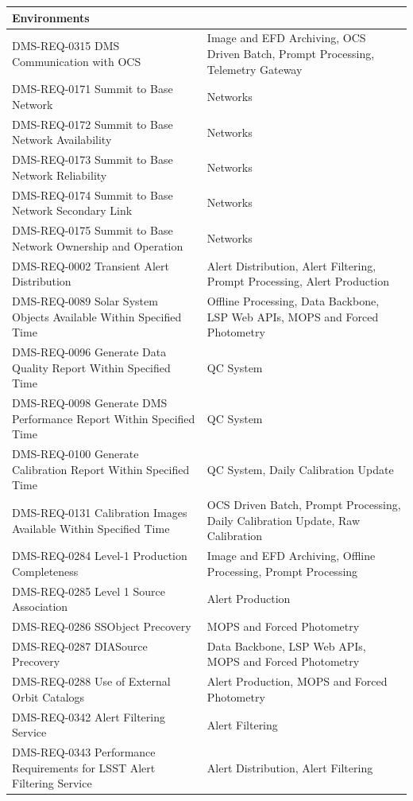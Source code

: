 \documentclass[DM,lsstdraft,toc]{lsstdoc}
\begin{document}
\begin{xtabular}{|p{0.4\textwidth}|p{0.55\textwidth}|}
Environments\\ \hline
DMS-REQ-0315 DMS Communication with OCS & Image and EFD Archiving, OCS
Driven Batch, Prompt Processing, Telemetry Gateway\\ \hline
DMS-REQ-0171 Summit to Base Network & Networks\\ \hline
DMS-REQ-0172 Summit to Base Network Availability &
Networks\\ \hline
DMS-REQ-0173 Summit to Base Network Reliability &
Networks\\ \hline
DMS-REQ-0174 Summit to Base Network Secondary Link &
Networks\\ \hline
DMS-REQ-0175 Summit to Base Network Ownership and Operation &
Networks\\ \hline
DMS-REQ-0002 Transient Alert Distribution & Alert Distribution, Alert
Filtering, Prompt Processing, Alert Production\\ \hline
DMS-REQ-0089 Solar System Objects Available Within Specified Time &
Offline Processing, Data Backbone, LSP Web APIs, MOPS and Forced
Photometry\\ \hline
DMS-REQ-0096 Generate Data Quality Report Within Specified Time & QC
System\\ \hline
DMS-REQ-0098 Generate DMS Performance Report Within Specified Time & QC
System\\ \hline
DMS-REQ-0100 Generate Calibration Report Within Specified Time & QC
System, Daily Calibration Update\\ \hline
DMS-REQ-0131 Calibration Images Available Within Specified Time & OCS
Driven Batch, Prompt Processing, Daily Calibration Update, Raw
Calibration\\ \hline
DMS-REQ-0284 Level-1 Production Completeness & Image and EFD Archiving,
Offline Processing, Prompt Processing\\ \hline
DMS-REQ-0285 Level 1 Source Association & Alert
Production\\ \hline
DMS-REQ-0286 SSObject Precovery & MOPS and Forced
Photometry\\ \hline
DMS-REQ-0287 DIASource Precovery & Data Backbone, LSP Web APIs, MOPS
and Forced Photometry\\ \hline
DMS-REQ-0288 Use of External Orbit Catalogs & Alert Production, MOPS and
Forced Photometry\\ \hline
DMS-REQ-0342 Alert Filtering Service & Alert Filtering\\ \hline
DMS-REQ-0343 Performance Requirements for LSST Alert Filtering Service &
Alert Distribution, Alert Filtering\\ \hline

\end{xtabular}
\end{document}
